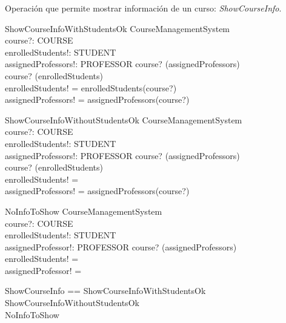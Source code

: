 \documentclass{article}
\begin{document}
Operación que permite mostrar información de un curso: \textit{ShowCourseInfo}.

\begin{schema}{ShowCourseInfoWithStudentsOk}
    \Xi CourseManagementSystem \\
    course?: COURSE \\
    enrolledStudents!: \power STUDENT \\
    assignedProfessors!: \power PROFESSOR
    \where
    course? \in \dom(assignedProfessors) \\
    course? \in \dom(enrolledStudents) \\
    enrolledStudents! = enrolledStudents(course?) \\
    assignedProfessors! = assignedProfessors(course?)
\end{schema}

\begin{schema}{ShowCourseInfoWithoutStudentsOk}
    \Xi CourseManagementSystem \\
    course?: COURSE \\
    enrolledStudents!: \power STUDENT \\
    assignedProfessors!: \power PROFESSOR
    \where
    course? \in \dom(assignedProfessors) \\
    course? \nin \dom(enrolledStudents) \\
    enrolledStudents! = \emptyset \\
    assignedProfessors! = assignedProfessors(course?)
\end{schema}

\begin{schema}{NoInfoToShow}
    \Xi CourseManagementSystem \\
    course?: COURSE \\
    enrolledStudents!: \power STUDENT \\
    assignedProfessor!: \power PROFESSOR
    \where
    course? \nin \dom(assignedProfessors) \\
    enrolledStudents! = \emptyset \\
    assignedProfessor! = \emptyset
\end{schema}

\begin{zed}
    ShowCourseInfo == ShowCourseInfoWithStudentsOk \lor ShowCourseInfoWithoutStudentsOk \\ 
    \hspace{2.90cm} \lor NoInfoToShow
\end{zed}
\end{document}
